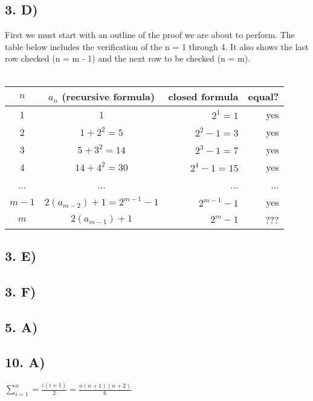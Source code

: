 \documentclass[12]{scrartcl}
\begin{document}
\subsection*{3. D)}
First we must start with an outline of the proof we are about to perform. The table below includes the verification of the n = 1 through 4. It also shows the last row checked (n = m - 1) and the next row to be checked (n = m). \\ \\
\begin{tabular}{ | c | c | r | r |  }
  \hline
 $n$ & $a_n$ (recursive formula) & closed formula & equal?  \\
  \hline
  1 & 1 & $2^1 = 1 $ & yes \\     \hline
  2 & $1 + 2^2 = 5$ & $2^2 - 1= 3$ & yes \\     \hline
  3 & $5 + 3^2 = 14$ & $2^3 - 1= 7$ & yes \\     \hline
  4 & $14 + 4^2 = 30$ & $2^4 - 1= 15$ & yes \\      \hline
  ... & ... & ... & ... \\   \hline
 $m - 1$ & $ 2 (a_{m-2}) + 1 = 2^{m-1} - 1$ & $2^{m-1} - 1$ & yes \\   \hline \hline
  $m$ & $2 (a_{m-1}) + 1$& $2^m-1$ & ??? \\                           
  \hline  
\end{tabular}
\subsection*{3. E)}

\subsection*{3. F)}

\subsection*{5. A)}

\subsection*{10. A)}

$\sum\limits_{i=1}^n = \frac{i(i+1)}{2}= \frac{n(n+1)(n+2)}{6}$
\end{document}
